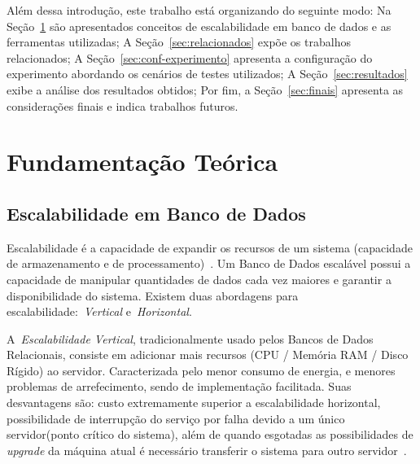 \documentclass[12pt]{article}
\begin{document}
Além dessa introdução, este trabalho está organizando do seguinte modo: Na Seção~\ref{sec:fundamentacao} são apresentados conceitos de escalabilidade em banco de dados e as ferramentas utilizadas; A Seção~\ref{sec:relacionados} expõe os trabalhos relacionados; A Seção~\ref{sec:conf-experimento} apresenta a configuração do experimento abordando os cenários de testes utilizados; A Seção~\ref{sec:resultados} exibe a análise dos resultados obtidos; Por fim, a Seção~\ref{sec:finais} apresenta as considerações finais e indica trabalhos futuros.

\section{Fundamentação Teórica}
\label{sec:fundamentacao}

\subsection{Escalabilidade em Banco de Dados}
\label{subsec:escalabilidade}

Escalabilidade é a capacidade de expandir os recursos de um sistema (capacidade de armazenamento e de processamento)~\cite{elmasri2010fundamentals}. Um Banco de Dados escalável possui a capacidade de manipular quantidades de dados cada vez maiores e garantir a disponibilidade do sistema. Existem duas abordagens para escalabilidade:~\emph{Vertical} e~\emph{Horizontal}.

A~\emph{Escalabilidade Vertical}, tradicionalmente usado pelos Bancos de Dados Relacionais, consiste em adicionar mais recursos (CPU / Memória RAM / Disco Rígido) ao servidor. Caracterizada pelo menor consumo de energia, e menores problemas de arrefecimento, sendo de implementação facilitada. Suas desvantagens são: custo extremamente superior a escalabilidade horizontal, possibilidade de interrupção do serviço por falha devido a um único servidor(ponto crítico do sistema), além de quando esgotadas as possibilidades de \textit{upgrade} da máquina atual é necessário transferir o sistema para outro servidor~\cite{hwang2014scale}.
\end{document}
